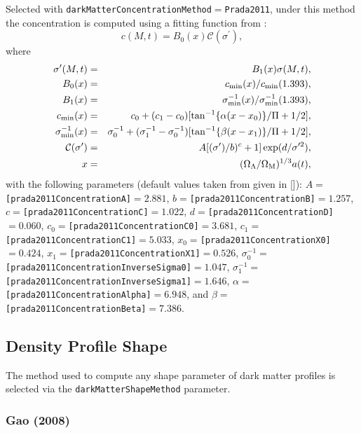 Selected with {\tt darkMatterConcentrationMethod}$=${\tt Prada2011}, under this method the concentration is computed using a fitting function from \cite{prada_halo_2011}:
\begin{equation}
c(M,t) = B_0(x) \mathcal{C}(\sigma^\prime),
\end{equation}
where
\begin{eqnarray}
\sigma^\prime(M,t) &=& B_1(x) \sigma(M,t), \\
B_0(x) &=& c_{\rm min}(x)/c_{\rm min}(1.393), \\
B_1(x) &=& \sigma^{-1}_{\rm min}(x)/\sigma^{-1}_{\rm min}(1.393), \\
c_{\rm min}(x) &=& c_0 + (c_1-c_0) [\tan^{-1}\{\alpha (x-x_0)\}/\Pi+1/2], \\
\sigma^{-1}_{\rm min}(x) &=& \sigma^{-1}_0 + (\sigma^{-1}_1-\sigma^{-1}_0) [\tan^{-1}\{\beta(x-x_1)\}/\Pi+1/2], \\
\mathcal{C}(\sigma^\prime) &=& A [(\sigma^\prime)/b)^c+1] \exp(d/\sigma^{\prime 2}), \\
x &=& (\Omega_\Lambda/\Omega_{\rm M})^{1/3} a(t),
\end{eqnarray}
with the following parameters (default values taken from \cite{prada_halo_2011} given in []): $A=${\tt [prada2011ConcentrationA]}$=2.881$, $b=${\tt [prada2011ConcentrationB]}$=1.257$, $c=${\tt [prada2011ConcentrationC]}$=1.022$, $d=${\tt [prada2011ConcentrationD]}$=0.060$, $c_0=${\tt [prada2011ConcentrationC0]}$=3.681$, $c_1=${\tt [prada2011ConcentrationC1]}$=5.033$, $x_0=${\tt [prada2011ConcentrationX0]}$=0.424$, $x_1=${\tt [prada2011ConcentrationX1]}$=0.526$, $\sigma^{-1}_0=${\tt [prada2011ConcentrationInverseSigma0]}$=1.047$, $\sigma^{-1}_1=${\tt [prada2011ConcentrationInverseSigma1]}$=1.646$, $\alpha=${\tt [prada2011ConcentrationAlpha]}$=6.948$, and $\beta=${\tt [prada2011ConcentrationBeta]}$=7.386$.

\subsection{Density Profile Shape}\label{sec:DarkMatterProfileShape}

The method used to compute any shape parameter of dark matter profiles is selected via the {\tt darkMatterShapeMethod} parameter.

\subsubsection{Gao (2008)}

